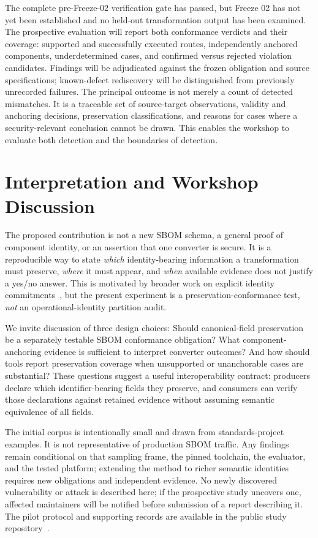 \documentclass[conference,10pt]{IEEEtran}
\begin{document}
The complete pre-Freeze-02 verification gate has passed,
but Freeze 02 has not yet been established and
no held-out transformation output has been examined.
The prospective evaluation will report both conformance verdicts and their
coverage: supported and successfully executed routes, independently anchored
components, underdetermined cases, and confirmed versus rejected violation
candidates.
Findings will be adjudicated against the frozen obligation and
source specifications; known-defect rediscovery will be distinguished from
previously unrecorded failures.
The principal outcome is not merely a count of detected mismatches.
It is a traceable set of source-target observations,
validity and anchoring decisions, preservation classifications, and reasons
for cases where a security-relevant conclusion cannot be drawn.
This enables the workshop to evaluate both detection and the boundaries of detection.

\section{Interpretation and Workshop Discussion}

The proposed contribution is not a new SBOM schema, a general proof of
component identity, or an assertion that one converter is secure.
It is a reproducible way to state \emph{which} identity-bearing information a
transformation must preserve, \emph{where} it must appear, and \emph{when}
available evidence does not justify a yes/no answer.
This is motivated by broader work on
explicit identity commitments~\cite{operationalidentity},
but the present experiment is a preservation-conformance test,
\emph{not} an operational-identity partition audit.

We invite discussion of three design choices:
Should canonical-field preservation be a separately testable SBOM conformance obligation?
What component-anchoring evidence is sufficient to interpret converter outcomes?
And how should tools report preservation coverage when unsupported or
unanchorable cases are substantial?
These questions suggest a useful interoperability contract:
producers declare which identifier-bearing fields they preserve, and
consumers can verify those declarations against retained
evidence without assuming semantic equivalence of all fields.

The initial corpus is intentionally small and drawn from standards-project examples.
It is not representative of production SBOM traffic.
Any findings remain conditional on that sampling frame, the pinned toolchain,
the evaluator, and the tested platform; extending the method to richer semantic
identities requires new obligations and independent evidence.
No newly discovered vulnerability or attack is described here;
if the prospective study uncovers one, affected maintainers will be notified
before submission of a report describing it.
The pilot protocol and supporting records are available in the
public study repository~\cite{pilot}.
\end{document}
